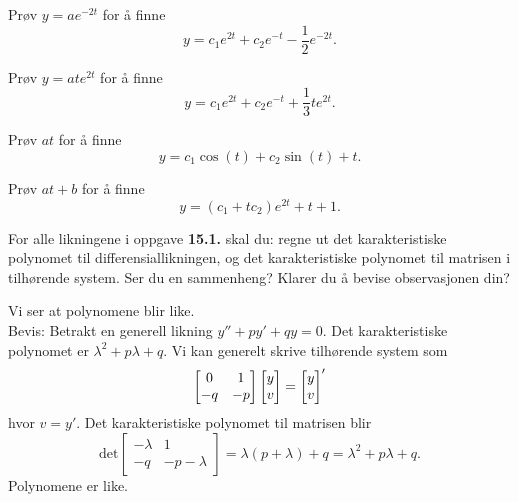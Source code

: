\begin{losning}
	\begin{punkt} Prøv $y=a e^{-2t}$ for å finne
		$$y=c_1 e^{2t}+c_2 e^{-t}-\frac{1}{2}e^{-2t}.$$
	\end{punkt}

	\begin{punkt} Prøv $y=a t e^{2t}$ for å finne
		$$y=c_1 e^{2t}+c_2 e^{-t}+\frac{1}{3} t e^{2t}.$$
	\end{punkt}
	
	\begin{punkt} Prøv $a t$ for å finne
		$$y=c_1\cos(t)+ c_2 \sin (t)+t.$$
	\end{punkt}
	
	\begin{punkt} Prøv $at+b$ for å finne
		$$y=(c_1+tc_2)e^{2t}+t+1.$$
	\end{punkt}
	
\end{losning}

\begin{oppgave}
For alle likningene i oppgave \textbf{15.1.} skal du: regne ut det karakteristiske polynomet til differensiallikningen, og det karakteristiske polynomet til matrisen i tilhørende system. Ser du en sammenheng? Klarer du å bevise observasjonen din?
\end{oppgave}

\begin{losning}
Vi ser at polynomene blir like.
\\

Bevis: Betrakt en generell likning $y''+py'+qy=0$. Det karakteristiske polynomet er $\lambda ^2+p\lambda+q$. Vi kan generelt skrive tilhørende system som $$\begin{bmatrix}
0 & 1\\
-q & -p
\end{bmatrix} \begin{bmatrix} y \\ v \end{bmatrix}=\begin{bmatrix} y \\ v \end{bmatrix} '
$$ hvor $v=y'$. Det karakteristiske polynomet til matrisen blir $$
\text{det}\begin{bmatrix}
-\lambda & 1\\
-q & -p-\lambda
\end{bmatrix}=\lambda(p+\lambda)+q=\lambda^2+p\lambda+q.
$$Polynomene er like.
\end{losning}
